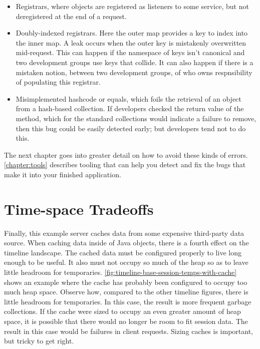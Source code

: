 \begin{itemize}
  \item Registrars, where objects are registered as listeners to some service,
  but not deregistered at the end of a request.
  \item Doubly-indexed registrars. Here the outer map provides a key to index
  into the inner map. A leak occurs when the outer key is mistakenly
  overwritten mid-request. This can happen if the namespace of keys isn't
  canonical and two development groups use keys that collide. It can also
  happen if there is a mistaken notion, between two development groups, of who
  owns respnsibility of populating this registrar.
  \item Misimplemented hashcode or equals, which foils the retrieval of an
  object from a hash-based collection. If developers checked the return value of
  the  method, which for the standard collections would indicate a failure to remove, then
  this bug could be easily detected early; but developers tend not to do this.
\end{itemize}

The next chapter goes into greater detail on how to avoid these kinds of
errors. \autoref{chapter:tools} describes tooling that can help you
detect and fix the bugs that make it into your finished application.

\section{Time-space Tradeoffs}
Finally, this example server caches data from some expensive third-party data
source. When caching data inside of Java objects, there is a fourth effect on
the timeline landscape. The
cached data must be configured properly to live long enough to be useful. It
also must not occupy so much of the heap so as to leave little headroom for
temporaries. \autoref{fig:timeline-base-session-temps-with-cache} shows an
example where the cache has probably been configured to occupy too much heap
space. Observe how, compared to the other timeline figures, there is little
headroom for temporaries. In this case, the result is more frequent garbage
collections. If the cache were sized to occupy an even greater amount of heap
space, it is possible that there would no longer be room to fit session data.
The result in this case would be failures in client requests. 
Sizing caches is important, but tricky to get right.

